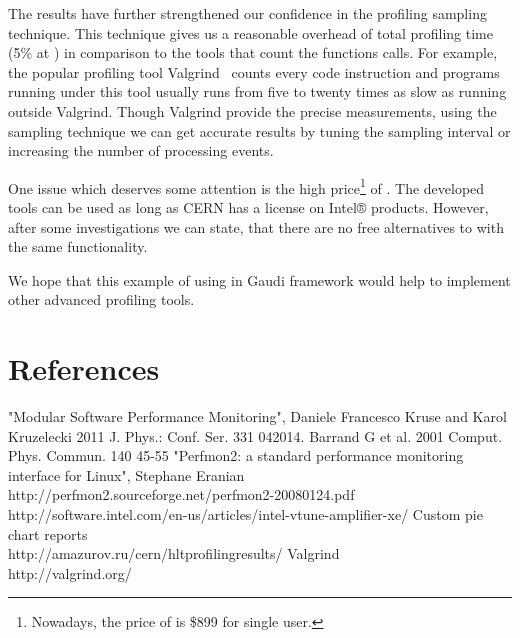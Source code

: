 \documentclass[a4paper]{jpconf}
\begin{document}
The results have further strengthened our confidence in the profiling sampling technique. This technique gives us a reasonable overhead of total profiling time (5\% at \iamp) in comparison to the tools that count the functions calls. For example, the popular profiling tool Valgrind~\cite{valgrind} counts every code instruction and programs running under this tool usually runs from five to twenty times as slow as running outside Valgrind. Though Valgrind provide the precise measurements, using the sampling technique we can get accurate results by tuning the sampling interval or increasing the number of processing events.

One issue  which deserves some attention is the high price\footnote[1]{Nowadays, the price of  is \$899 for single user.} of \iamp. The developed tools can be used as long as CERN has a license on Intel® products. However, after some investigations we can state, that there are no free alternatives to \amp with the same functionality.

We hope that this example of using \iamp in  Gaudi framework would help to implement other advanced profiling tools.

\section*{References}
\begin{thebibliography}{9}
 "Modular Software Performance Monitoring",  Daniele Francesco Kruse and Karol Kruzelecki 2011 J. Phys.: Conf. Ser. 331 042014. 
 Barrand G et al. 2001 Comput. Phys. Commun. 140 45-55
 "Perfmon2: a standard performance monitoring interface for Linux", Stephane Eranian\\
http://perfmon2.sourceforge.net/perfmon2-20080124.pdf
 \iamp \\ http://software.intel.com/en-us/articles/intel-vtune-amplifier-xe/
 Custom pie chart reports \\ http://amazurov.ru/cern/hltprofilingresults/
 Valgrind \\ http://valgrind.org/
\end{thebibliography}
\end{document}
